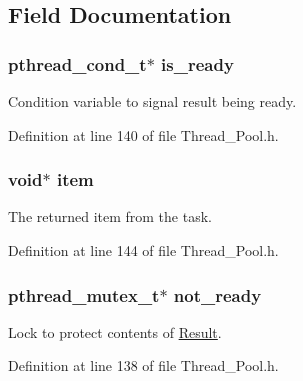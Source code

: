 \subsection{Field Documentation}
\hypertarget{struct_result_a8f707934732f685f1b1b53a855de60d4}{}
\subsubsection[{is\+\_\+ready}]{\setlength{\rightskip}{0pt plus 5cm}pthread\+\_\+cond\+\_\+t$\ast$ is\+\_\+ready}\label{struct_result_a8f707934732f685f1b1b53a855de60d4}


Condition variable to signal result being ready. 



Definition at line 140 of file Thread\+\_\+\+Pool.\+h.

\hypertarget{struct_result_aeeeae972d4d97226aa998aa9ca91346c}{}
\subsubsection[{item}]{\setlength{\rightskip}{0pt plus 5cm}void$\ast$ item}\label{struct_result_aeeeae972d4d97226aa998aa9ca91346c}


The returned item from the task. 



Definition at line 144 of file Thread\+\_\+\+Pool.\+h.

\hypertarget{struct_result_a29a502fc8aca81df1310e7c10c3d99af}{}
\subsubsection[{not\+\_\+ready}]{\setlength{\rightskip}{0pt plus 5cm}pthread\+\_\+mutex\+\_\+t$\ast$ not\+\_\+ready}\label{struct_result_a29a502fc8aca81df1310e7c10c3d99af}


Lock to protect contents of \textquotesingle{}\hyperlink{struct_result}{Result}\textquotesingle{}. 



Definition at line 138 of file Thread\+\_\+\+Pool.\+h.

\hypertarget{struct_result_a7ad32217267e7e0144abffa4e782867c}{}
